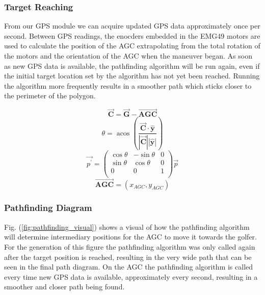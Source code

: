 \documentclass[11pt,landscape]{article}
\begin{document}
\begin{multicols}{3}
\subsubsection{Target Reaching}
From our GPS module we can acquire updated GPS data approximately once per
second. Between GPS readings, the enocders embedded in the EMG49 motors are used
to calculate the position of the AGC extrapolating from the total rotation of
the motors and the orientation of the AGC when the maneuver began. As soon as
new GPS data is available, the pathfinding algorithm will be run again, even if
the initial target location set by the algorithm has not yet been reached.
Running the algorithm more frequently results in a smoother path which sticks
closer to the perimeter of the polygon.

\begin{equation}
        \overrightarrow{\mathbf{C}} = \overrightarrow{\mathbf{G}} - \overrightarrow{\mathbf{AGC}}
    \label{eq:chord}
\end{equation}
\hspace{0.5cm}
\begin{equation}
        \theta=\operatorname{acos}\left(\frac{\overrightarrow{\mathbf{C}} \cdot \hat{\mathbf{y}}}{|\overrightarrow{\mathbf{C}}| |\hat{\mathbf{y}}|}\right)
    \label{eq:theta}
\end{equation}
\hspace{1cm}
\begin{equation}
    \overrightarrow{p^\prime} = \left(\begin{matrix}
        \operatorname{cos}\theta & -\operatorname{sin}\theta & 0 \\
        \operatorname{sin}\theta & \operatorname{cos}\theta & 0 \\
        0 & 0& 1\\
    \end{matrix}\right) \overrightarrow{p}
    \label{eq:rotation_mat}
\end{equation}
\hspace{0.5cm}
\begin{equation*}
    \overrightarrow{\mathbf{AGC}} = (x_{AGC}, y_{AGC})
\end{equation*}

\subsubsection{Pathfinding Diagram}
Fig. (\ref{fig:pathfinding_visual}) shows a visual of how the pathfinding
algorithm will determine intermediary positions for the AGC to move it towards
the golfer. For the generation of this figure the pathfinding algorithm was only
called again after the target position is reached, resulting in the very wide
path that can be seen in the final path diagram. On the AGC the pathfinding
algorithm is called every time new GPS data is available, approximately every
second, resulting in a smoother and closer path being found.
\end{multicols}
\end{document}
